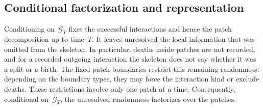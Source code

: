 \subsection{Conditional factorization and representation}
\label{sec:representation}

%

%
%
%
%

Conditioning on~$\mathcal G_T$ fixes the successful interactions and hence the
patch decomposition up to time~$T$. It leaves unresolved the local information
that was omitted from the skeleton. In particular, deaths inside patches are
not recorded, and for a recorded outgoing interaction the skeleton does not say
whether it was a split or a birth. The fixed patch boundaries restrict this
remaining randomness: depending on the boundary types, they may force the
interaction kind or exclude deaths. These restrictions involve only one patch
at a time. Consequently, conditional on~$\mathcal G_T$, the unresolved
randomness factorizes over the patches.

